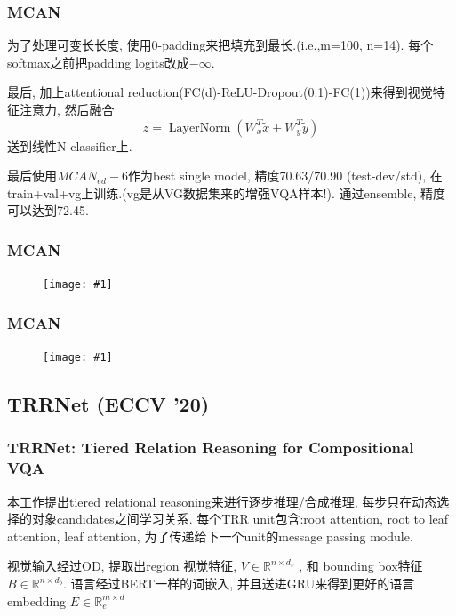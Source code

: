 \documentclass{beamer}
\newcommand{\cfig}[2]{
    \begin{figure}[htbp]
    \centering
    \texttt{[image: \#1]}
\end{figure}
}
\begin{document}
\begin{frame}
    \frametitle{MCAN}

    为了处理可变长长度, 使用0-padding来把填充到最长.(i.e.,m=100, n=14). 每个softmax之前把padding logits改成$-\infty$.

    最后, 加上attentional reduction(FC(d)-ReLU-Dropout(0.1)-FC(1))来得到视觉特征注意力, 然后融合
    \begin{equation}
        z=\operatorname{LayerNorm}\left(W_{x}^{T} \tilde{x}+W_{y}^{T} \tilde{y}\right)
    \end{equation}
    送到线性N-classifier上.
    
    最后使用$MCAN_{ed}-6$作为best single model, 精度70.63/70.90 (test-dev/std), 在train+val+vg上训练.(vg是从VG数据集来的增强VQA样本!). 通过ensemble, 精度可以达到72.45.

\end{frame}
\begin{frame}
    \frametitle{MCAN}

    \cfig{mcan-mod.png}{0.9}

\end{frame}

\begin{frame}
    \frametitle{MCAN}

    \cfig{mcan-arch2.png}{0.8}

\end{frame}


\subsection{TRRNet (ECCV '20)}

\begin{frame}
    \frametitle{TRRNet: Tiered Relation Reasoning for Compositional VQA}

    本工作提出tiered relational reasoning来进行逐步推理/合成推理, 每步只在动态选择的对象candidates之间学习关系. 每个TRR unit包含:root attention, root to leaf attention, leaf attention, 为了传递给下一个unit的message passing module.

    视觉输入经过OD, 提取出region 视觉特征, $V \in \mathbb{R}^{n \times d_{v}}$
    , 和 bounding box特征$B \in \mathbb{R}^{n \times d_{b}}$.
    语言经过BERT一样的词嵌入, 并且送进GRU来得到更好的语言embedding $E \in \mathbb{R}^{m \times d}_{e}$

\end{frame}
\end{document}
